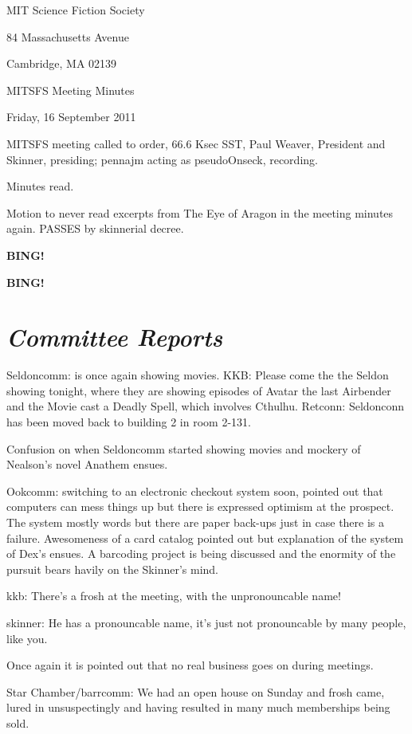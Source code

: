 \documentclass[10pt]{article}
\newcommand{\bing}{{\bf BING!} }
\newcommand{\goto}[1]{\bing \vskip 12pt \section*{{\em{#1}}}}
\newcommand{\skinner}{Paul Weaver, President and Skinner}
\newcommand{\onseck}{pennajm acting as pseudoOnseck}
\newcommand{\meetingdate}{Friday, 16 September 2011}
\begin{document}
\begin{center}

MIT Science Fiction Society

84 Massachusetts Avenue

Cambridge, MA 02139

\vspace{12pt}

MITSFS Meeting Minutes

\meetingdate

\end{center}

\vspace{18pt}

\setlength{\parskip}{6pt}

\noindent
MITSFS meeting called to order, 66.6 Ksec SST,
\skinner, presiding; \onseck, recording.

Minutes read.

Motion to never read excerpts from The Eye of Aragon in the meeting minutes again. PASSES by skinnerial decree.

\bing

\goto{Committee Reports}

Seldoncomm: is once again showing movies. KKB: Please come the the Seldon showing tonight, where they are showing episodes of Avatar the last Airbender and the Movie cast a Deadly Spell, which involves Cthulhu. Retconn: Seldonconn has been moved back to building 2 in room 2-131.

Confusion on when Seldoncomm started showing movies and mockery of Nealson's novel Anathem ensues.

Ookcomm: switching to an electronic checkout system soon, pointed out that computers can mess things up but there is expressed optimism at the prospect. The system mostly words but there are paper back-ups just in case there is a failure. Awesomeness of a card catalog pointed out but explanation of the system of Dex's ensues. A barcoding project is being discussed and the enormity of the pursuit bears havily on the Skinner's mind. 

kkb: There's a frosh at the meeting, with the unpronouncable name!

skinner: He has a pronouncable name, it's just not pronouncable by many people, like you.

Once again it is pointed out that no real business goes on during meetings.

Star Chamber/barrcomm: We had an open house on Sunday and frosh came, lured in unsuspectingly and having resulted in many much memberships being sold.
\end{document}
